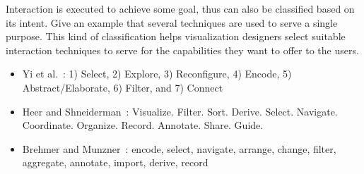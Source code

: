 Interaction is executed to achieve some goal, thus can also be classified based on its intent. Give an example that several techniques are used to serve a single purpose. This kind of classification helps visualization designers select suitable interaction techniques to serve for the capabilities they want to offer to the users.


\begin{itemize}
	\item Yi et al.~\cite{Yi2007}: 1) Select, 2) Explore, 3) Reconfigure, 4) Encode, 5) Abstract/Elaborate, 6) Filter, and 7)
Connect
	\item Heer and Shneiderman~\cite{Heer2012}:  Visualize. Filter. Sort. Derive. Select. Navigate. Coordinate. Organize. Record. Annotate. Share. Guide.
	\item Brehmer and Munzner~\cite{Brehmer2013}: encode, select, navigate, arrange, change, filter, aggregate, annotate, import, derive, record
\end{itemize}


%
%

